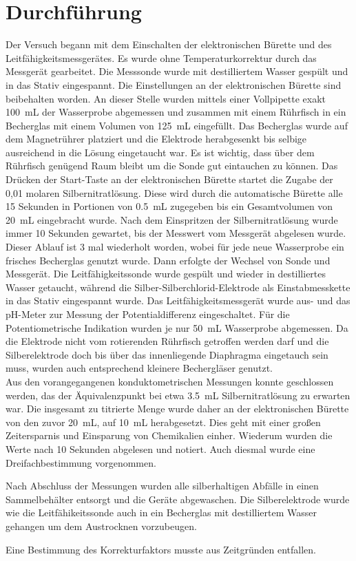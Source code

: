 \section{Durchführung}
\label{sec:durchfuerung}

Der Versuch begann mit dem Einschalten der elektronischen Bürette und des Leitfähigkeitsmessgerätes. Es wurde ohne Temperaturkorrektur durch das Messgerät gearbeitet. Die Messsonde wurde mit destilliertem Wasser gespült und in das Stativ eingespannt. Die Einstellungen an der elektronischen Bürette sind beibehalten worden. An dieser Stelle wurden mittels einer Vollpipette exakt \SI{100}{\milli\liter} der Wasserprobe abgemessen und zusammen mit einem Rührfisch in ein Becherglas mit einem Volumen von \SI{125}{\milli\liter} eingefüllt. Das Becherglas wurde auf dem Magnetrührer platziert und die Elektrode herabgesenkt bis selbige ausreichend in die Lösung eingetaucht war. Es ist wichtig, dass über dem Rührfisch genügend Raum bleibt um die Sonde gut eintauchen zu können. Das Drücken der Start-Taste an der elektronischen Bürette startet die Zugabe der 0,01 molaren Silbernitratlösung. Diese wird durch die automatische Bürette alle 15 Sekunden in Portionen von \SI{0,5}{\milli\liter} zugegeben bis ein Gesamtvolumen von \SI{20}{\milli\liter} eingebracht wurde. Nach dem Einspritzen der Silbernitratlösung wurde immer 10 Sekunden gewartet, bis der Messwert vom Messgerät abgelesen wurde. Dieser Ablauf ist 3 mal wiederholt worden, wobei für jede neue Wasserprobe ein frisches Becherglas genutzt wurde. Dann erfolgte der Wechsel von Sonde und Messgerät. Die Leitfähigkeitssonde wurde gespült und wieder in destilliertes Wasser getaucht, während die Silber-Silberchlorid-Elektrode als Einstabmesskette in das Stativ eingespannt wurde. Das Leitfähigkeitsmessgerät wurde aus- und das pH-Meter zur Messung der Potentialdifferenz eingeschaltet. Für die Potentiometrische Indikation wurden je nur \SI{50}{\milli\liter} Wasserprobe abgemessen. Da die Elektrode  nicht vom rotierenden Rührfisch getroffen werden darf und die Silberelektrode doch bis über das innenliegende Diaphragma eingetauch sein muss, wurden auch entsprechend kleinere Bechergläser genutzt. \\
Aus den vorangegangenen konduktometrischen Messungen konnte geschlossen werden, das der Äquivalenzpunkt bei etwa \SI{3,5}{\milli\liter} Silbernitratlösung zu erwarten war. Die insgesamt zu titrierte Menge wurde daher an der elektronischen Bürette von den zuvor \SI{20}{\milli\liter}, auf \SI{10}{\milli\liter} herabgesetzt. Dies geht mit einer großen Zeitersparnis und Einsparung von Chemikalien einher. Wiederum wurden die Werte nach 10 Sekunden abgelesen und notiert. Auch diesmal wurde eine Dreifachbestimmung vorgenommen.

Nach Abschluss der Messungen wurden alle silberhaltigen Abfälle in einen Sammelbehälter entsorgt und die Geräte abgewaschen. Die Silberelektrode wurde wie die Leitfähikeitssonde auch in ein Becherglas mit destilliertem Wasser gehangen um dem Austrocknen vorzubeugen.

Eine Bestimmung des Korrekturfaktors musste aus Zeitgründen entfallen.
